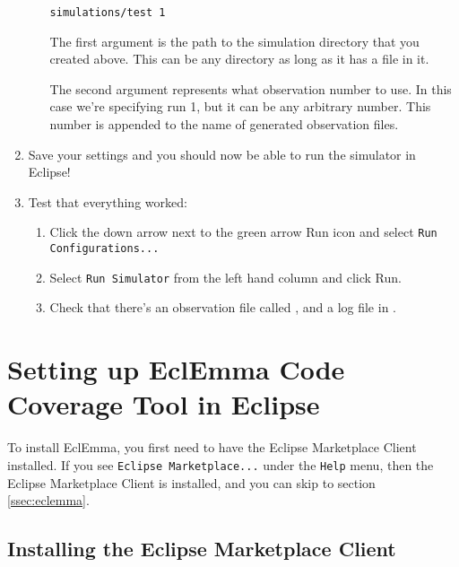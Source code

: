 \documentclass[11pt]{article}
\begin{document}
\begin{enumerate}
\begin{enumerate}
\begin{verbatim}
simulations/test 1
\end{verbatim}

The first argument is the path to the simulation directory that you created above.  This can be any directory as long as it has a
 file in it.

The second argument represents what observation number to use. In this case we're specifying run 1, but it can be any arbitrary number. This number is appended to the name of generated observation files.
  \end{enumerate}
  
\item Save your settings and you should now be able to run the simulator in Eclipse!

\item Test that everything worked:
  \begin{enumerate}
  \item Click the down arrow next to the green arrow Run icon and select
    \texttt{Run Configurations...}
  \item Select \texttt{Run Simulator} from the left hand column and click Run.
  \item Check that there's an observation file called
    , and a log file in
    .
  \end{enumerate}

\end{enumerate}

\section{Setting up EclEmma Code Coverage Tool in Eclipse}

To install EclEmma, you first need to have the Eclipse Marketplace Client
installed. If you see \texttt{Eclipse Marketplace...} under the \texttt{Help} menu,
then the Eclipse Marketplace Client is installed, and you can skip to section
\ref{ssec:eclemma}.

\subsection{Installing the Eclipse Marketplace Client}
\end{document}
